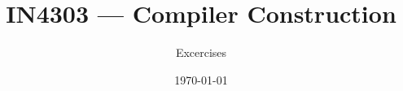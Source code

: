 \documentclass[a4paper, addpoints, leqno, answers]{exam}
\title{IN4303 --- Compiler Construction}
\author{Excercises}
\date{\today}
\begin{document}
\pointsinrightmargin
\totalformat{(\totalpoints\ \points)}
\unframedsolutions

\begin{questions}



\newpage


\end{questions}
\end{document}
